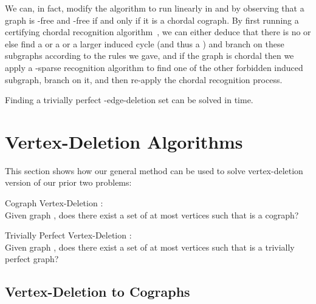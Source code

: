 \documentclass{llncs}
\begin{document}
We can, in fact, modify the algorithm to run linearly in  and  by observing that a graph is -free and -free if and only if it is a chordal cograph. By first running a certifying chordal recognition algorithm~\cite{TaYa}, we can either deduce that there is no  or else find a  or a  or a larger induced cycle (and thus a ) and branch on these subgraphs according to the rules we gave, and if the graph is chordal then we apply a -sparse recognition algorithm to find one of the other forbidden induced subgraph, branch on it, and then re-apply the chordal recognition process.

\begin{theorem}
Finding a trivially perfect -edge-deletion set can be solved in  time.
\end{theorem}



\section{Vertex-Deletion Algorithms}

This section shows how our general method can be used to solve vertex-deletion version of our prior two problems:

\begin{problem}{\sc Cograph Vertex-Deletion} :\\
Given graph , does there exist a set  of at most  vertices such that  is a cograph?
\end{problem}

\begin{problem}{\sc Trivially Perfect Vertex-Deletion} :\\
Given graph , does there exist a set  of at most  vertices such that  is a trivially perfect graph?
\end{problem}

\subsection{Vertex-Deletion to Cographs}
\end{document}
